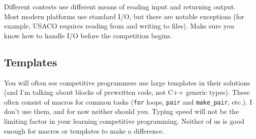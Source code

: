 Different contests use different means of reading input and returning output. Most modern platforms use standard I/O, but there are notable exceptions (for example, USACO requires reading from and writing to files). Make sure you know how to handle I/O before the competition begins.

\subsection*{Templates}

You will often see competitive programmers use large templates in their solutions (and I'm talking about blocks of prewritten code, not C++ generic types). These often consist of macros for common tasks (\texttt{for} loops, \texttt{pair} and \texttt{make_pair}, etc.). I don't use them, and for now neither should you. Typing speed will not be the limiting factor in your learning competitive programming. Neither of us is good enough for macros or templates to make a difference.

